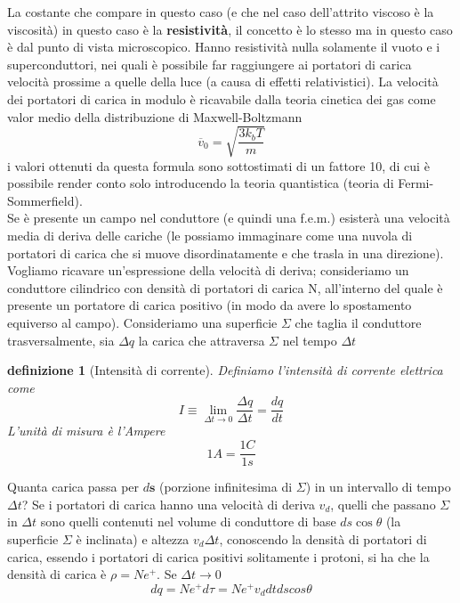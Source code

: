 \documentclass[10pt,a4paper]{article}
\newtheorem{definizione}{definizione}
\begin{document}
La costante che compare in questo caso (e che nel caso dell'attrito viscoso è la viscosità) in questo caso è la \textbf{resistività}, il concetto è lo stesso ma in questo caso è dal punto di vista microscopico. Hanno resistività nulla solamente il vuoto e i superconduttori, nei quali è possibile far raggiungere ai portatori di carica velocità prossime a quelle della luce (a causa di effetti relativistici). La velocità dei portatori di carica in modulo è ricavabile dalla teoria cinetica dei gas come valor medio della distribuzione di Maxwell-Boltzmann
\[\overline{v}_0=\sqrt{\frac{3k_b T}{m}}\]
i valori ottenuti da questa formula sono sottostimati di un fattore 10, di cui è possibile render conto solo introducendo la teoria quantistica (teoria di Fermi-Sommerfield).\\
Se è presente un campo nel conduttore (e quindi una f.e.m.) esisterà una velocità media di deriva delle cariche (le possiamo immaginare come una nuvola di portatori di carica che si muove disordinatamente e che trasla in una direzione). Vogliamo ricavare un'espressione della velocità di deriva; consideriamo un conduttore cilindrico con densità di portatori di carica N, all'interno del quale è presente un portatore di carica positivo (in modo da avere lo spostamento equiverso al campo). Consideriamo una superficie \(\Sigma\) che taglia il conduttore trasversalmente, sia $\Delta q$ la carica che attraversa $\Sigma$ nel tempo $\Delta t$
\begin{definizione}[Intensità di corrente]
	Definiamo l'intensità di corrente elettrica come
	\[I \equiv \lim_{\Delta t \to 0} \frac{\Delta q}{\Delta t}=\frac{dq}{dt}\]
	L'unità di misura è l'Ampere
	\[1 A = \frac{1 C}{1 s}\]
\end{definizione}
Quanta carica passa per \(d\mathbf{s}\) (porzione infinitesima di $\Sigma$) in un intervallo di tempo $\Delta t$? Se i portatori di carica hanno una velocità di deriva \(v_d\), quelli che passano $\Sigma$ in $\Delta t$ sono quelli contenuti nel volume di conduttore di base \(ds\cos\theta\) (la superficie $\Sigma$ è inclinata) e altezza $v_d\Delta t$, conoscendo la densità di portatori di carica, essendo i portatori di carica positivi solitamente i protoni, si ha che la densità di carica è \(\rho = N e^+\). Se $\Delta t \to 0$
\[dq = N e^+ d\tau = N e^+ v_d dt ds cos\theta\]
\end{document}
